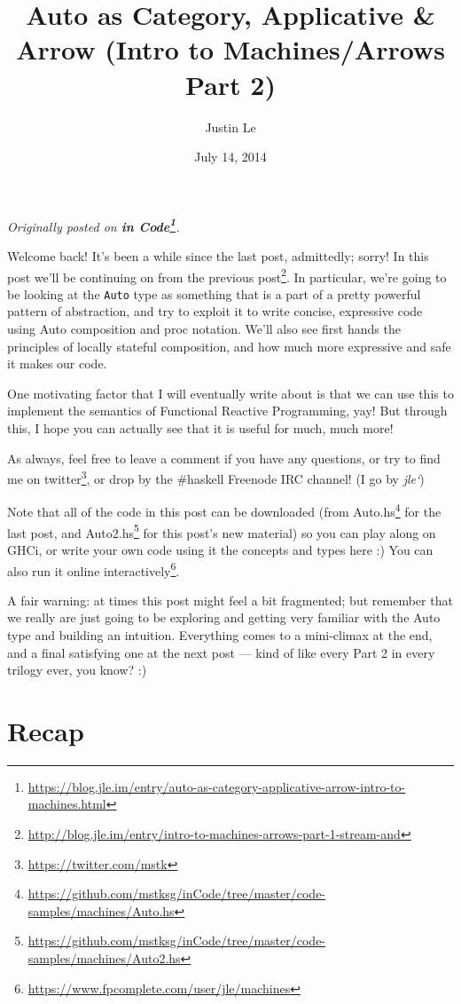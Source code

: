 \documentclass[]{article}
\title{Auto as Category, Applicative \& Arrow (Intro to Machines/Arrows Part 2)}
\author{Justin Le}
\date{July 14, 2014}
\renewcommand{\href}[2]{#2\footnote{\url{#1}}}
\begin{document}
\maketitle

\emph{Originally posted on
\textbf{\href{https://blog.jle.im/entry/auto-as-category-applicative-arrow-intro-to-machines.html}{in
Code}}.}

Welcome back! It's been a while since the last post, admittedly; sorry! In this
post we'll be continuing on from
\href{http://blog.jle.im/entry/intro-to-machines-arrows-part-1-stream-and}{the
previous post}. In particular, we're going to be looking at the \texttt{Auto}
type as something that is a part of a pretty powerful pattern of abstraction,
and try to exploit it to write concise, expressive code using Auto composition
and proc notation. We'll also see first hands the principles of locally stateful
composition, and how much more expressive and safe it makes our code.

One motivating factor that I will eventually write about is that we can use this
to implement the semantics of Functional Reactive Programming, yay! But through
this, I hope you can actually see that it is useful for much, much more!

As always, feel free to leave a comment if you have any questions, or try to
find me on \href{https://twitter.com/mstk}{twitter}, or drop by the \#haskell
Freenode IRC channel! (I go by \emph{jle`})

Note that all of the code in this post can be downloaded (from
\href{https://github.com/mstksg/inCode/tree/master/code-samples/machines/Auto.hs}{Auto.hs}
for the last post, and
\href{https://github.com/mstksg/inCode/tree/master/code-samples/machines/Auto2.hs}{Auto2.hs}
for this post's new material) so you can play along on GHCi, or write your own
code using it the concepts and types here :) You can also run it
\href{https://www.fpcomplete.com/user/jle/machines}{online interactively}.

A fair warning: at times this post might feel a bit fragmented; but remember
that we really are just going to be exploring and getting very familiar with the
Auto type and building an intuition. Everything comes to a mini-climax at the
end, and a final satisfying one at the next post --- kind of like every Part 2
in every trilogy ever, you know? :)

\hypertarget{recap}{%
\section{Recap}\label{recap}}
\end{document}
